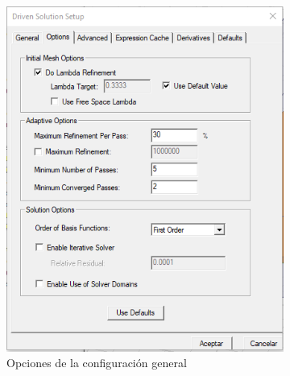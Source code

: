 \begin{figure}[H]
     \centering
     \begin{subfigure}[b]{0.35\textwidth}
         \centering
         \includegraphics[width=\textwidth]{archivos/desarrollo/9a}
         \caption{Opciones de la configuración general}
         \label{fig:configa}
     \end{subfigure}
     \hfill
     \begin{subfigure}[b]{0.35\textwidth}
         \centering

\end{subfigure}
\end{figure}
